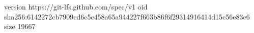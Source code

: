 version https://git-lfs.github.com/spec/v1
oid sha256:6142272cb7909cd6c5c458a65a944227f663b86f6f29314916414d15c56e83c6
size 19667

